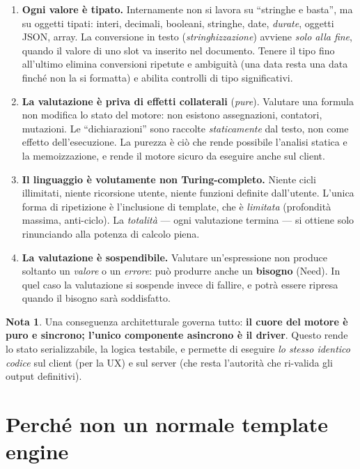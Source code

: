 \documentclass[11pt,a4paper]{book}
\newcommand{\ic}[1]{{\ttfamily #1}}
\theoremstyle{definition}
\newtheorem*{nota}{Nota}
\begin{document}
\begin{enumerate}
  \item \textbf{Ogni valore è tipato.} Internamente non si lavora su ``stringhe e
    basta'', ma su oggetti tipati: interi, decimali, booleani, stringhe, date,
    \emph{durate}, oggetti JSON, array. La conversione in testo
    (\emph{stringhizzazione}) avviene \emph{solo alla fine}, quando il valore di
    uno slot va inserito nel documento. Tenere il tipo fino all'ultimo elimina
    conversioni ripetute e ambiguità (una data resta una data finché non la si
    formatta) e abilita controlli di tipo significativi.
  \item \textbf{La valutazione è priva di effetti collaterali} (\emph{pure}).
    Valutare una formula non modifica lo stato del motore: non esistono
    assegnazioni, contatori, mutazioni. Le ``dichiarazioni'' sono raccolte
    \emph{staticamente} dal testo, non come effetto dell'esecuzione. La purezza è
    ciò che rende possibile l'analisi statica e la memoizzazione, e rende il
    motore sicuro da eseguire anche sul client.
  \item \textbf{Il linguaggio è volutamente non Turing-completo.} Niente cicli
    illimitati, niente ricorsione utente, niente funzioni definite dall'utente.
    L'unica forma di ripetizione è l'inclusione di template, che è \emph{limitata}
    (profondità massima, anti-ciclo). La \emph{totalità} --- ogni valutazione
    termina --- si ottiene solo rinunciando alla potenza di calcolo piena.
  \item \textbf{La valutazione è sospendibile.} Valutare un'espressione non
    produce soltanto un \emph{valore} o un \emph{errore}: può produrre anche un
    \textbf{bisogno} (\ic{Need}). In quel caso la valutazione si sospende invece
    di fallire, e potrà essere ripresa quando il bisogno sarà soddisfatto.
\end{enumerate}

\begin{nota}
Una conseguenza architetturale governa tutto: \textbf{il cuore del motore è puro
e sincrono; l'unico componente asincrono è il driver}. Questo rende lo stato
serializzabile, la logica testabile, e permette di eseguire \emph{lo stesso
identico codice} sul client (per la UX) e sul server (che resta l'autorità che
ri-valida gli output definitivi).
\end{nota}

\section{Perché non un normale template engine}
\end{document}
